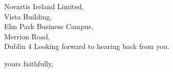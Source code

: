 \documentclass[11pt]{letter} %
\begin{document}
\begin{letter}{Novartis Ireland Limited, \\
Vista Building, \\
Elm Park Business Campus, \\
Merrion Road, \\
Dublin 4}
  Looking forward to hearing back from you.

  \vspace{2\parskip} %
  \closing{yours faithfully,}
  \vspace{2\parskip} %




\end{letter}
\end{document}
